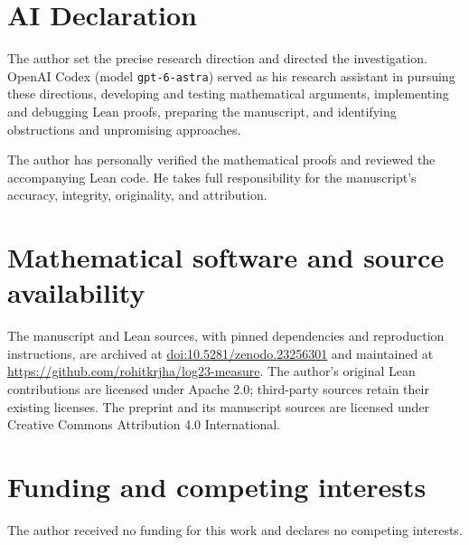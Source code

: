 \section*{AI Declaration}

The author set the precise research direction and directed the
investigation. OpenAI Codex (model \texttt{gpt-6-astra}) served as
his research assistant in pursuing these directions, developing
and testing mathematical arguments, implementing and debugging Lean
proofs, preparing the manuscript, and identifying obstructions and
unpromising approaches.

The author has personally verified the mathematical proofs and
reviewed the accompanying Lean code. He takes full responsibility
for the manuscript's accuracy, integrity, originality, and attribution.

\section*{Mathematical software and source availability}

The manuscript and Lean sources, with pinned dependencies and
reproduction instructions, are archived at
\href{https://doi.org/10.5281/zenodo.23256301}{doi:10.5281/zenodo.23256301}
and maintained at \url{https://github.com/rohitkrjha/log23-measure}.
The author's original Lean contributions are licensed under
Apache 2.0; third-party sources retain their existing licenses.
The preprint and its manuscript sources are licensed under
Creative Commons Attribution 4.0 International.

\section*{Funding and competing interests}

The author received no funding for this work and declares no
competing interests.
